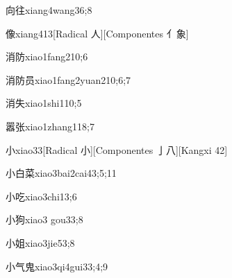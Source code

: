 \begin{verbete}{向往}{xiang4wang3}{6;8}
\end{verbete}

\begin{verbete}{像}{xiang4}{13}[Radical 人][Componentes 亻象]
\end{verbete}

\begin{verbete}{消防}{xiao1fang2}{10;6}
\end{verbete}

\begin{verbete}{消防员}{xiao1fang2yuan2}{10;6;7}
\end{verbete}

\begin{verbete}{消失}{xiao1shi1}{10;5}
\end{verbete}

\begin{verbete}{嚣张}{xiao1zhang1}{18;7}
\end{verbete}

\begin{verbete}{小}{xiao3}{3}[Radical 小][Componentes 亅八][Kangxi 42]
\end{verbete}

\begin{verbete}{小白菜}{xiao3bai2cai4}{3;5;11}
\end{verbete}

\begin{verbete}{小吃}{xiao3chi1}{3;6}
\end{verbete}

\begin{verbete}{小狗}{xiao3 gou3}{3;8}
\end{verbete}

\begin{verbete}{小姐}{xiao3jie5}{3;8}
\end{verbete}

\begin{verbete}{小气鬼}{xiao3qi4gui3}{3;4;9}
\end{verbete}

